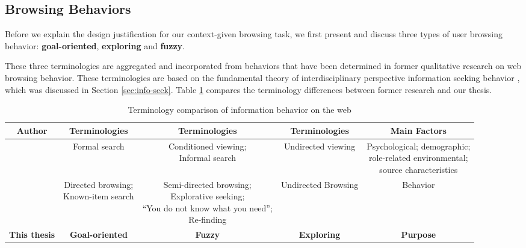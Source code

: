 


\subsection{Browsing Behaviors}
\label{sec:behavior}

Before we explain the design justification for our context-given browsing task, 
we first present and discuss three types of user browsing behavior: 
\textbf{goal-oriented}, \textbf{exploring} and \textbf{fuzzy}.

These three terminologies are aggregated and incorporated from behaviors that 
have been determined in former qualitative research on web browsing behavior.
These terminologies are based on the fundamental theory of 
interdisciplinary perspective information seeking behavior \cite{wilson1997information},
which was discussed in Section \ref{sec:info-seek}.
Table \ref{table:info-seek} compares the terminology differences between former research 
and our thesis.

\begin{table}[H]
    \small
    \centering
    \caption{Terminology comparison of information behavior on the web}
    \begin{adjustbox}{width=\textwidth}
        \begin{tabular}{ccccc}
            \toprule
            \textbf{Author} & \textbf{Terminologies} & \textbf{Terminologies} & \textbf{Terminologies} & \textbf{Main Factors} \\
            \hline
            \cite{choo1999information} & Formal search & \makecell{Conditioned viewing; \\ Informal search} & Undirected viewing & \makecell{Psychological; demographic;\\ role-related environmental; \\source characteristics} \\
            \cite{johnson2017patterns} & \makecell{Directed browsing; \\Known-item search} & \makecell{Semi-directed browsing; \\Explorative seeking; \\``You do not know what you need''; \\Re-finding} & Undirected Browsing & Behavior \\
            \textbf{This thesis} & \textbf{Goal-oriented} & \textbf{Fuzzy} & \textbf{Exploring} & \textbf{Purpose} \\
            \bottomrule
        \end{tabular}
        \label{table:info-seek}
    \end{adjustbox}
\end{table}

